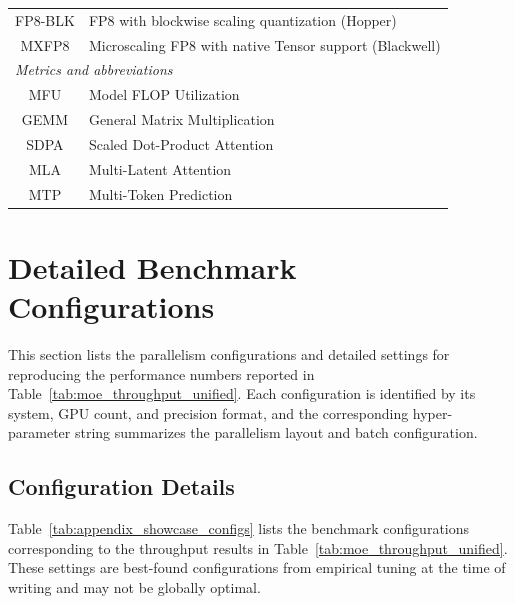\begin{table}[ht]
\begin{tabular}{cl}
FP8-BLK & FP8 with blockwise scaling quantization (Hopper) \\
MXFP8 & Microscaling FP8 with native Tensor support (Blackwell) \\
\midrule
\multicolumn{2}{l}{\emph{Metrics and abbreviations}} \\
MFU & Model FLOP Utilization \\
GEMM & General Matrix Multiplication \\
SDPA & Scaled Dot-Product Attention \\
MLA & Multi-Latent Attention \\
MTP & Multi-Token Prediction \\
\bottomrule
\end{tabular}
\end{table}


\section{Detailed Benchmark Configurations}\label{sec:showcase_settings}

This section lists the parallelism configurations and detailed settings for reproducing the performance numbers reported in Table~\ref{tab:moe_throughput_unified}. Each configuration is identified by its system, GPU count, and precision format, and the corresponding hyper-parameter string summarizes the parallelism layout and batch configuration. 

\subsection{Configuration Details} 
Table~\ref{tab:appendix_showcase_configs} lists the benchmark configurations corresponding to the throughput results in Table~\ref{tab:moe_throughput_unified}. These settings are best-found configurations from empirical tuning at the time of writing and may not be globally optimal.

